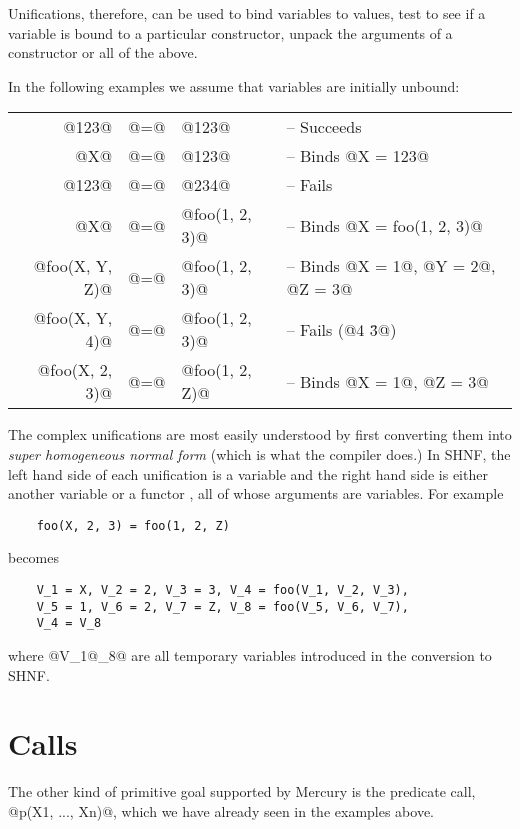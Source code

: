 Unifications, therefore, can be used to bind variables to
values, test to see if a variable is bound to a particular
constructor, unpack the arguments of a constructor or all of
the above.

In the following examples we assume that variables are
initially unbound:

\begin{tabular}{rcll}
         @123@ & @=@ & @123@ &
                -- Succeeds \\
           @X@ & @=@ & @123@ &
                -- Binds @X = 123@ \\
         @123@ & @=@ & @234@ &
                -- Fails \\
           @X@ & @=@ & @foo(1, 2, 3)@ &
                -- Binds @X = foo(1, 2, 3)@ \\
@foo(X, Y, Z)@ & @=@ & @foo(1, 2, 3)@ &
                -- Binds @X = 1@, @Y = 2@, @Z = 3@ \\
@foo(X, Y, 4)@ & @=@ & @foo(1, 2, 3)@ &
                -- Fails (@4 \= 3@) \\
@foo(X, 2, 3)@ & @=@ & @foo(1, 2, Z)@ &
                -- Binds @X = 1@, @Z = 3@ \\
\end{tabular}

The complex unifications are most easily understood by first
converting them into \emph{super homogeneous normal form} (which is
what the compiler does.)  In SHNF, the left hand side of each
unification is a variable and the right hand side is either
another variable or a functor , all of
whose arguments are variables.  For example

\begin{verbatim}
    foo(X, 2, 3) = foo(1, 2, Z)
\end{verbatim}
becomes
\begin{verbatim}
    V_1 = X, V_2 = 2, V_3 = 3, V_4 = foo(V_1, V_2, V_3),
    V_5 = 1, V_6 = 2, V_7 = Z, V_8 = foo(V_5, V_6, V_7),
    V_4 = V_8
\end{verbatim}
where @V_1@\ldots@V_8@ are all temporary variables
introduced in the conversion to SHNF.

\section{Calls}
The other kind of primitive goal supported by Mercury is the
predicate call, @p(X1, ..., Xn)@, which we have already seen in
the examples above.

